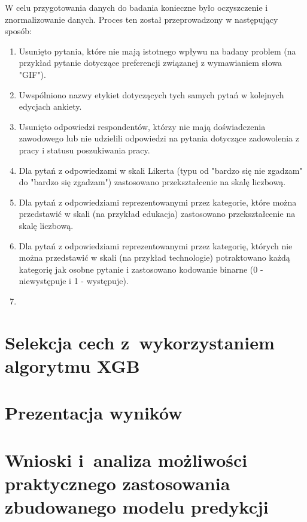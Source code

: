 W celu przygotowania danych do badania konieczne było oczyszczenie i znormalizowanie danych. Proces ten został przeprowadzony w następujący sposób:
\begin{enumerate}
    \item Usunięto pytania, które nie mają istotnego wpływu na badany problem (na przykład pytanie dotyczące preferencji związanej z wymawianiem słowa "GIF").
    \item Uwspólniono nazwy etykiet dotyczących tych samych pytań w kolejnych edycjach ankiety.
    \item Usunięto odpowiedzi respondentów, którzy nie mają doświadczenia zawodowego lub nie udzielili odpowiedzi na pytania dotyczące zadowolenia z pracy i statusu poszukiwania pracy.
    \item Dla pytań z odpowiedzami w skali Likerta (typu od "bardzo się nie zgadzam" do "bardzo się zgadzam") zastosowano przekształcenie na skalę liczbową.
    \item Dla pytań z odpowiedziami reprezentowanymi przez kategorie, które można przedstawić w skali (na przykład edukacja) zastosowano przekształcenie na skalę liczbową.
    \item Dla pytań z odpowiedziami reprezentowanymi przez kategorię, których nie można przedstawić w skali (na przykład technologie) potraktowano każdą kategorię jak osobne pytanie i zastosowano kodowanie binarne (0 - niewystępuje i 1 - występuje).
    \item
    \end{enumerate}
\section{Selekcja cech z~wykorzystaniem algorytmu XGB}\label{sec:analysis:feature-selection-xgb}
\section{Prezentacja wyników}\label{sec:analysis:important-features}
\todo{}
\section{Wnioski i~analiza możliwości praktycznego zastosowania zbudowanego modelu predykcji}\label{sec:analysis:model-fitness}

\thispagestyle{normal}
